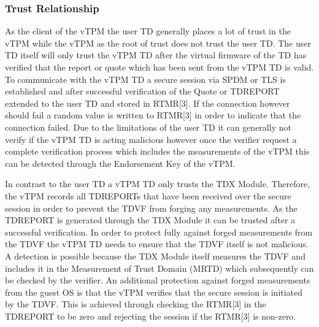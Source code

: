 \documentclass[sigplan,screen,nonacm]{acmart}
\begin{document}
\subsubsection{Trust Relationship}
As the client of the vTPM the user TD generally places a lot of trust in the vTPM while the vTPM as the root of trust does not trust the user TD.
The user TD itself will only trust the vTPM TD after the virtual firmware of the TD has verified that the report or quote which has been sent from the vTPM TD is valid.
To communicate with the vTPM TD a secure session via SPDM or TLS is established and after successful verification of the Quote or TDREPORT extended to the user TD and stored in RTMR[3].
If the connection however should fail a random value is written to RTMR[3] in order to indicate that the connection failed.
Due to the limitations of the user TD it can generally not verify if the vTPM TD is acting malicious however once the verifier request a complete verification process which includes the measurements of the vTPM this can be detected through the Endorsement Key of the vTPM.

In contrast to the user TD a vTPM TD only trusts the TDX Module.
Therefore, the vTPM records all TDREPORTs that have been received over the secure session in order to prevent the TDVF from forging any measurements.
As the TDREPORT is generated through the TDX Module it can be trusted after a successful verification.
In order to protect fully against forged measurements from the TDVF the vTPM TD needs to ensure that the TDVF itself is not malicious.
A detection is possible because the TDX Module itself measures the TDVF and includes it in the Measurement of Trust Domain (MRTD) which subsequently can be checked by the verifier.
An additional protection against forged measurements from the guest OS is that the vTPM verifies that the secure session is initiated by the TDVF.
This is achieved through checking the RTMR[3] in the TDREPORT to be zero and rejecting the session if the RTMR[3] is non-zero.
\end{document}
